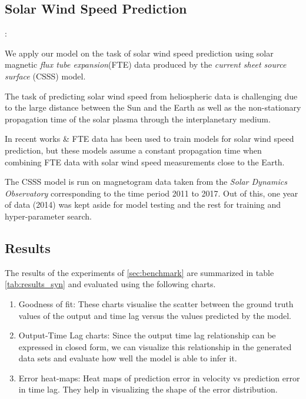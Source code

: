 \documentclass[envcountsect,runningheads]{llncs}
\theoremstyle{etoile}
\begin{document}
\subsection{Solar Wind Speed Prediction}:\label{sec:solarwind}

We apply our model on the task of solar wind speed prediction using 
solar magnetic \emph{flux tube expansion}(FTE) data produced by the 
\emph{current sheet source surface} (CSSS) \cite{csss} model.

The task of predicting solar wind speed from heliospheric data is challenging due 
to the large distance between the Sun and the Earth as well as the non-stationary 
propagation time of the solar plasma through the interplanetary medium.

In recent works \cite{Poduval_2014} \& \cite{neuralnetsw} FTE data has been used to
train models for solar wind speed prediction, but these models assume a constant propagation 
time when combining FTE data with solar wind speed measurements close to the Earth. 

The CSSS model is run on magnetogram data taken from the \emph{Solar Dynamics Observatory} 
corresponding to the time period 2011 to 2017. Out of this, one year of data (2014) was 
kept aside for model testing and the rest for training and hyper-parameter search.

\subsection{Results}

The results of the experiments of \ref{sec:benchmark} are summarized in table \ref{tab:results_syn} 
and evaluated using the following charts.

\begin{enumerate}
    \item Goodness of fit: These charts visualise the scatter between the ground truth values of the output
          and time lag versus the values predicted by the model. 
    \item Output-Time Lag charts: Since the output time lag relationship can be expressed in closed 
          form, we can visualize this relationship in the generated data sets and evaluate how well 
          the model is able to infer it.
    \item Error heat-maps: Heat maps of prediction error in velocity vs prediction error 
          in time lag. They help in visualizing the shape of the error distribution.
\end{enumerate}
\end{document}
